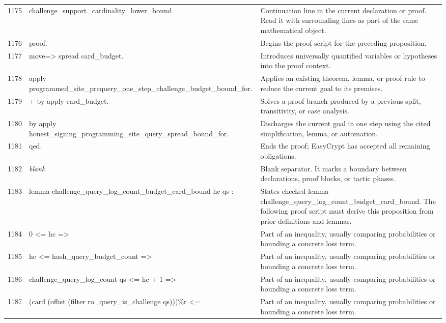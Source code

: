 \documentclass[10pt]{article}
\begin{document}
\begin{longtable}{r L{0.53\textwidth} L{0.37\textwidth}}
1175 & {\ttfamily\scriptsize     challenge\_support\_cardinality\_lower\_bound.} & Continuation line in the current declaration or proof.  Read it with surrounding lines as part of the same mathematical object. \\
1176 & {\ttfamily\scriptsize proof.} & Begins the proof script for the preceding proposition. \\
1177 & {\ttfamily\scriptsize move=> spread card\_budget.} & Introduces universally quantified variables or hypotheses into the proof context. \\
1178 & {\ttfamily\scriptsize apply programmed\_site\_prequery\_one\_step\_challenge\_budget\_bound\_for.} & Applies an existing theorem, lemma, or proof rule to reduce the current goal to its premises. \\
1179 & {\ttfamily\scriptsize + by apply card\_budget.} & Solves a proof branch produced by a previous split, transitivity, or case analysis. \\
1180 & {\ttfamily\scriptsize by apply honest\_signing\_programming\_site\_query\_spread\_bound\_for.} & Discharges the current goal in one step using the cited simplification, lemma, or automation. \\
1181 & {\ttfamily\scriptsize qed.} & Ends the proof; EasyCrypt has accepted all remaining obligations. \\
1182 & {\ttfamily\scriptsize \emph{blank}} & Blank separator.  It marks a boundary between declarations, proof blocks, or tactic phases. \\
1183 & {\ttfamily\scriptsize lemma challenge\_query\_log\_count\_budget\_card\_bound hc qs :} & States checked lemma challenge\_query\_log\_count\_budget\_card\_bound.  The following proof script must derive this proposition from prior definitions and lemmas. \\
1184 & {\ttfamily\scriptsize   0 <= hc =>} & Part of an inequality, usually comparing probabilities or bounding a concrete loss term. \\
1185 & {\ttfamily\scriptsize   hc <= hash\_query\_budget\_count =>} & Part of an inequality, usually comparing probabilities or bounding a concrete loss term. \\
1186 & {\ttfamily\scriptsize   challenge\_query\_log\_count qs <= hc + 1 =>} & Part of an inequality, usually comparing probabilities or bounding a concrete loss term. \\
1187 & {\ttfamily\scriptsize   (card (oflist (filter ro\_query\_is\_challenge qs)))\%r <=} & Part of an inequality, usually comparing probabilities or bounding a concrete loss term. \\

\end{longtable}
\end{document}
